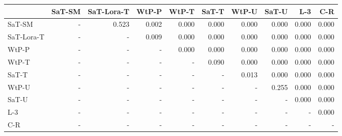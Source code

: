 \begin{tabular}{lrrrrrrrrr}
\toprule
 & SaT-SM & SaT-Lora-T & WtP-P & WtP-T & SaT-T & WtP-U & SaT-U & L-3 & C-R \\
\midrule
SaT-SM & - & 0.523 & 0.002 & 0.000 & 0.000 & 0.000 & 0.000 & 0.000 & 0.000 \\
SaT-Lora-T & - & - & 0.009 & 0.000 & 0.000 & 0.000 & 0.000 & 0.000 & 0.000 \\
WtP-P & - & - & - & 0.000 & 0.000 & 0.000 & 0.000 & 0.000 & 0.000 \\
WtP-T & - & - & - & - & 0.090 & 0.000 & 0.000 & 0.000 & 0.000 \\
SaT-T & - & - & - & - & - & 0.013 & 0.000 & 0.000 & 0.000 \\
WtP-U & - & - & - & - & - & - & 0.255 & 0.000 & 0.000 \\
SaT-U & - & - & - & - & - & - & - & 0.000 & 0.000 \\
L-3 & - & - & - & - & - & - & - & - & 0.000 \\
C-R & - & - & - & - & - & - & - & - & - \\
\bottomrule
\end{tabular}

